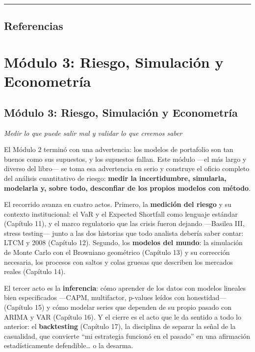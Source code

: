 \documentclass[
  spanish,
  letterpaper,
  DIV=11,
  numbers=noendperiod]{scrreprt}
\begin{document}
\begin{center}\rule{0.5\linewidth}{0.5pt}\end{center}

\chapter{Referencias}\label{referencias-9}

\label{refs}

\part{Módulo 3: Riesgo, Simulación y Econometría}

\chapter*{Módulo 3: Riesgo, Simulación y
Econometría}\label{muxf3dulo-3-riesgo-simulaciuxf3n-y-econometruxeda-1}


\emph{Medir lo que puede salir mal y validar lo que creemos saber}

El Módulo 2 terminó con una advertencia: los modelos de portafolio son
tan buenos como sus supuestos, y los supuestos fallan. Este módulo ---el
más largo y diverso del libro--- se toma esa advertencia en serio y
construye el oficio completo del análisis cuantitativo de riesgo:
\textbf{medir la incertidumbre, simularla, modelarla y, sobre todo,
desconfiar de los propios modelos con método}.

El recorrido avanza en cuatro actos. Primero, la \textbf{medición del
riesgo} y su contexto institucional: el VaR y el Expected Shortfall como
lenguaje estándar (Capítulo 11), y el marco regulatorio que las crisis
fueron dejando ---Basilea III, stress testing--- junto a las dos
historias que todo analista debería saber contar: LTCM y 2008 (Capítulo
12). Segundo, los \textbf{modelos del mundo}: la simulación de Monte
Carlo con el Browniano geométrico (Capítulo 13) y su corrección
necesaria, los procesos con saltos y colas gruesas que describen los
mercados reales (Capítulo 14).

El tercer acto es la \textbf{inferencia}: cómo aprender de los datos con
modelos lineales bien especificados ---CAPM, multifactor, p-values
leídos con honestidad--- (Capítulo 15) y cómo modelar series que
dependen de su propio pasado con ARIMA y VAR (Capítulo 16). Y el cierre
es el acto que le da sentido a todo lo anterior: el \textbf{backtesting}
(Capítulo 17), la disciplina de separar la señal de la casualidad, que
convierte ``mi estrategia funcionó en el pasado'' en una afirmación
estadísticamente defendible\ldots{} o la desarma.
\end{document}
